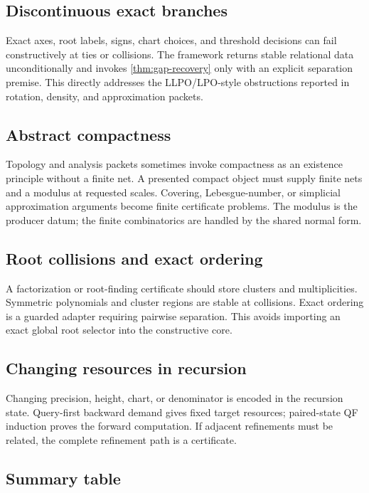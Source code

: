 \subsection{Discontinuous exact branches}

Exact axes, root labels, signs, chart choices, and threshold decisions can fail
constructively at ties or collisions.  The framework returns stable relational
data unconditionally and invokes \cref{thm:gap-recovery} only with an explicit
separation premise.  This directly addresses the LLPO/LPO-style obstructions
reported in rotation, density, and approximation packets.

\subsection{Abstract compactness}

Topology and analysis packets sometimes invoke compactness as an existence
principle without a finite net.  A presented compact object must supply finite
nets and a modulus at requested scales.  Covering, Lebesgue-number, or
simplicial approximation arguments become finite certificate problems.  The
modulus is the producer datum; the finite combinatorics are handled by the
shared normal form.

\subsection{Root collisions and exact ordering}

A factorization or root-finding certificate should store clusters and
multiplicities.  Symmetric polynomials and cluster regions are stable at
collisions.  Exact ordering is a guarded adapter requiring pairwise separation.
This avoids importing an exact global root selector into the constructive
core.

\subsection{Changing resources in recursion}

Changing precision, height, chart, or denominator is encoded in the recursion
state.  Query-first backward demand gives fixed target resources; paired-state
QF induction proves the forward computation.  If adjacent refinements must be
related, the complete refinement path is a certificate.

\subsection{Summary table}

